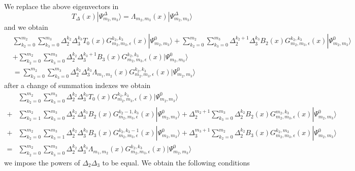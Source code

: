 \documentclass[11pt]{article}
\numberwithin{equation}{section}
\numberwithin{equation}{subsection}
\begin{document}
We replace the above eigenvectors in 
\begin{equation}
T_{\Delta}(x)|\Psi_{m_{2},m_{3}}^{\Delta}\rangle=\Lambda_{m_{2},m_{3}}(x)|\Psi_{m_{2},m_{3}}^{\Delta}\rangle
\end{equation}
and we obtain
\begin{align*}
&\sum_{k_{2}=0}^{m_{2}}\sum_{k_{3}=0}^{m_{3}}\Delta_{2}^{k_{2}}\Delta_{3}^{k_{3}}T_{0}(x)G_{m_{2},m_{3},\epsilon}^{k_{2},k_{3}}(x)|\Psi_{m_{2},m_{3}}^{0}\rangle+\sum_{k_{2}=0}^{m_{2}}\sum_{k_{3}=0}^{m_{3}}\Delta_{2}^{k_{2}+1}\Delta_{3}^{k_{3}}B_{2}(x)G_{m_{2},m_{3},\epsilon}^{k_{2},k_{3}}(x)|\Psi_{m_{2},m_{3}}^{0}\rangle
\\&
+\sum_{k_{2}=0}^{m_{2}}\sum_{k_{3}=0}^{m_{3}}\Delta_{2}^{k_{2}}\Delta_{3}^{k_{3}+1}B_{3}(x)G_{m_{2},m_{3},\epsilon}^{k_{2},k_{3}}(x)|\Psi_{m_{2},m_{3}}^{0}\rangle
\\&=
\sum_{k_{2}=0}^{m_{2}}\sum_{k_{3}=0}^{m_{3}}\Delta_{2}^{k_{2}}\Delta_{3}^{k_{3}}\Lambda_{m_{1},m_{2}}(x)G_{m_{2},m_{3},\epsilon}^{k_{2},k_{3}}(x)|\Psi_{m_{2},m_{3}}^{0}\rangle
\end{align*}
after a change of summation indexes we obtain
\begin{align*}
&\sum_{k_{2}=0}^{m_{2}}\sum_{k_{3}=0}^{m_{3}}\Delta_{2}^{k_{2}}\Delta_{3}^{k_{3}}T_{0}(x)G_{m_{2},m_{3},\epsilon}^{k_{2},k_{3}}(x)|\Psi_{m_{2},m_{3}}^{0}\rangle
\\+&
\sum_{k_{2}=1}^{m_{2}}\sum_{k_{3}=0}^{m_{3}}\Delta_{2}^{k_{2}}\Delta_{3}^{k_{3}}B_{2}(x)G_{m_{2},m_{3},\epsilon}^{k_{2}-1,k_{3}}(x)|\Psi_{m_{2},m_{3}}^{0}\rangle+\Delta_{2}^{m_{2}+1}\sum_{k_{3}=0}^{m_{3}}\Delta_{2}^{k_{2}}B_{2}(x)G_{m_{2},m_{3},\epsilon}^{m_{2},k_{3}}(x)|\Psi_{m_{2},m_{3}}^{0}\rangle
\\+&
\sum_{k_{2}=0}^{m_{2}}\sum_{k_{3}=1}^{m_{3}}\Delta_{2}^{k_{2}}\Delta_{3}^{k_{3}}B_{3}(x)G_{m_{2},m_{3},\epsilon}^{k_{2},k_{3}-1}(x)|\Psi_{m_{2},m_{3}}^{0}\rangle+\Delta_{3}^{m_{3}+1}\sum_{k_{2}=0}^{m_{2}}\Delta_{2}^{k_{2}}B_{3}(x)G_{m_{2},m_{3},\epsilon}^{k_{2},m_{3}}(x)|\Psi_{m_{2},m_{3}}^{0}\rangle
\\=&
\sum_{k_{2}=0}^{m_{2}}\sum_{k_{3}=0}^{m_{3}}\Delta_{2}^{k_{2}}\Delta_{3}^{k_{3}}\Lambda_{m_{1},m_{2}}(x)G_{m_{2},m_{3},\epsilon}^{k_{2},k_{3}}(x)|\Psi_{m_{2},m_{3}}^{0}\rangle
\end{align*}
we impose the powers of $\Delta_{2}\Delta_{3}$ to be equal. We obtain the following conditions 
\end{document}
